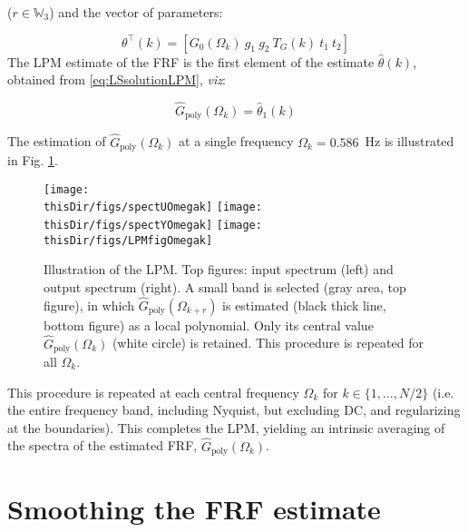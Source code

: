 \noindent
($r\in\mathbb{W}_3$)
and the vector of parameters:




\begin{equation}\label{lpmThetaEst}
\theta^\top(k)=\left[G_0(\Omega_k) \ g_1 \ g_2\  T_G(k)\  t_1 \ t_2\right]
\end{equation}
The LPM estimate of the FRF is the first element of the estimate $\hat\theta(k)$, obtained from \eqref{eq:LSsolutionLPM}, \emph{viz}:



\begin{equation}
\hat{G}_\text{poly}(\Omega_k) = \hat\theta_1(k)
\end{equation}


The estimation of $\hat{G}_\text{poly}(\Omega_k)$ at a single frequency $\Omega_k = 0.586$~Hz is illustrated in Fig. \ref{LPM_Schematic_EG}.%
\begin{figure}[htb] %
   \centering




   \texttt{[image: \\thisDir/figs/spectUOmegak]} 
   \texttt{[image: \\thisDir/figs/spectYOmegak]} 
   \texttt{[image: \\thisDir/figs/LPMfigOmegak]} 
   \caption{Illustration of the LPM. Top figures: input spectrum (left) and output spectrum (right). A small band is selected (gray area, top figure), in which $\hat G_\mathrm{poly}(\Omega_{k+r})$ is estimated (black thick line, bottom figure) as a local polynomial. Only its central value $\hat G_\mathrm{poly}(\Omega_k)$ (white circle) is retained. This procedure is repeated for all $\Omega_k$.}


   

   \label{LPM_Schematic_EG}
\end{figure}
This procedure is repeated at each central frequency $\Omega_k$ for  $k\in \{1,\dots,N/2\}$ (i.e. the entire frequency band, including Nyquist, but excluding DC, and regularizing at the boundaries). This completes the LPM, yielding an intrinsic averaging of the spectra of the estimated FRF, $\hat{G}_\text{poly}(\Omega_k)$.

\section{Smoothing the FRF estimate}\label{se:smoothingFRFestimate}



